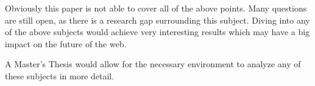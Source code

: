 Obviously this paper is not able to cover all of the above points. Many questions are still open, as there is a research gap surrounding this subject. Diving into any of the above subjects would achieve very interesting results which may have a big impact on the future of the web.

A Master's Thesis would allow for the necessary environment to analyze any of these subjects in more detail.